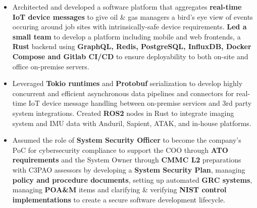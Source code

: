 \documentclass[10pt,a4paper,ragged2e]{altacv}
\begin{document}

\begin{fullwidth}
\makecvheader
\end{fullwidth}


\begin{itemize}
\item Architected and developed a software platform that aggregates \textbf{real-time IoT device messages} to give oil \& gas managers a bird's eye view of events occuring around job sites with intrinsically-safe device requirements. \textbf{Led a small team} to develop a platform including mobile and web frontends, a \textbf{Rust} backend using \textbf{GraphQL, Redis, PostgreSQL, InfluxDB, Docker Compose and Gitlab CI/CD} to ensure deployability to both on-site and office on-premise servers.
\item Leveraged \textbf{Tokio runtimes} and \textbf{Protobuf} serialization to develop highly concurrent and efficient asynchronous data pipelines and connectors for real-time IoT device message handling between on-premise services and 3rd party system integrations. Created \textbf{ROS2} nodes in Rust to integrate imaging system and IMU data with Anduril, Sapient, ATAK, and in-house platforms.
\item Assumed the role of \textbf{System Security Officer} to become the company's PoC for cybersecurity compliance to support the COO through \textbf{ATO requirements} and the System Owner through \textbf{CMMC L2} preparations with C3PAO assessors by developing a \textbf{System Security Plan}, managing \textbf{policy and procedure documents}, setting up automated \textbf{GRC systems}, managing \textbf{POA\&M} items and clarifying \& verifying \textbf{NIST control implementations} to create a secure software development lifecycle.
\end{itemize}
\divider
\end{document}

